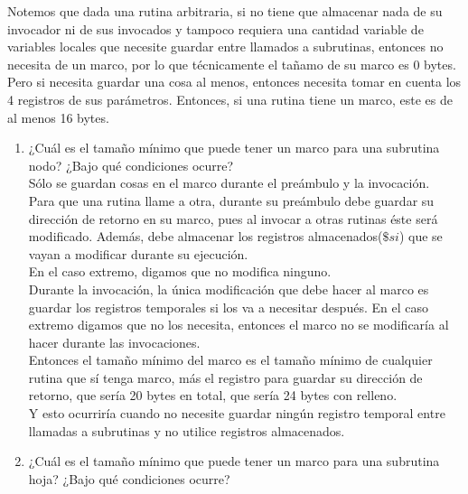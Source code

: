 \documentclass{article}
\begin{document}
\begin{enumerate}
{	Notemos que dada una rutina arbitraria, si no tiene que almacenar nada de su
	invocador ni de sus invocados y tampoco requiera una cantidad variable de 
	variables locales que necesite guardar entre llamados a subrutinas, entonces
	no necesita de un marco, por lo que técnicamente el tañamo de su marco es 0
	bytes.\\
	Pero si necesita guardar una cosa al menos, entonces necesita tomar en
	cuenta los 4 registros de sus parámetros. Entonces, si una rutina tiene un
	marco, este es de al menos 16 bytes.
	
		\begin{enumerate}
			\item {
			¿Cuál es el tamaño mínimo que puede tener un marco para una 
			subrutina nodo? ¿Bajo qué condiciones ocurre?\\
			Sólo se guardan cosas en el marco durante el preámbulo y la 
			invocación.\\
			
			Para que una rutina llame a otra, durante su preámbulo debe guardar 
			su dirección de retorno en su marco, pues al invocar a otras rutinas
			éste será modificado. Además, debe almacenar los registros
			almacenados($\$si$) que se vayan a modificar durante su ejecución.\\
			En el caso extremo, digamos que no modifica ninguno.\\
			Durante la invocación, la única modificación que debe hacer al marco
			es guardar los registros temporales si los va a necesitar después.
			En el caso extremo digamos que no los necesita, entonces el marco 
			no se modificaría al hacer durante las invocaciones.\\
			Entonces el tamaño mínimo del marco es el tamaño mínimo de cualquier
			rutina que sí tenga marco, más el registro para guardar su dirección
			de retorno, que sería 20 bytes en total, que sería 24 bytes con 
			relleno.\\
			
			Y esto ocurriría cuando no necesite guardar ningún registro temporal
			entre llamadas a subrutinas y no utilice registros almacenados.\\
			}
			\item {
			¿Cuál es el tamaño mínimo que puede tener un marco para una 
			subrutina hoja? ¿Bajo qué condiciones ocurre?\\
			
}
\end{enumerate}}
\end{enumerate}
\end{document}
